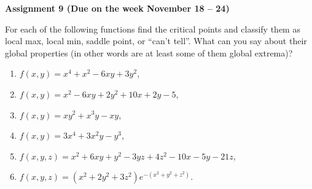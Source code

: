 \documentclass{article}
\begin{document}
\fontsize{14}{21}
\selectfont
\centerline{\textbf{Assignment 9 (Due on the week November 18 -- 24)}}
\fontsize{12}{18}
\selectfont

For each of the following functions find the critical points and classify them as local max, local min, saddle point, or ``can't tell''. What can you say about their global properties (in other words are at least some of them global extrema)?

\begin{enumerate}
\item $f(x,y)=x^4+x^2-6xy+3y^2$,
\item $f(x,y)=x^2-6xy+2y^2+10x+2y-5$,
\item $f(x,y)=xy^2+x^3y-xy$,
\item $f(x,y)=3x^4+3x^2y-y^3$,
\item $f(x,y, z)=x^2+6xy+y^2-3yz+4z^2-10x-5y-21z$,
\item $f(x,y,z)=(x^2+2y^2+3z^2)e^{-(x^2+y^2+z^2)}$.
\end{enumerate}
\end{document}
